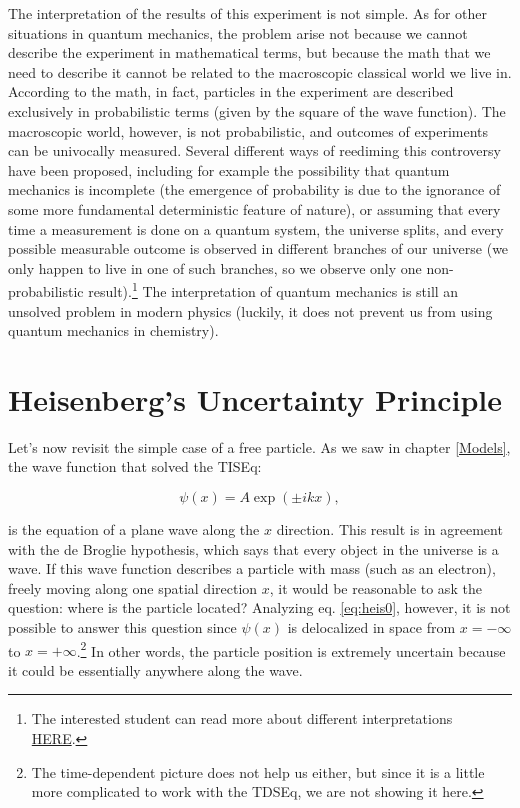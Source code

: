\documentclass[
  9pt,
]{extbook}
\theoremstyle{definition}
\theoremstyle{definition}
\theoremstyle{definition}
\theoremstyle{remark}
\begin{document}
The interpretation of the results of this experiment is not simple. As for other situations in quantum mechanics, the problem arise not because we cannot describe the experiment in mathematical terms, but because the math that we need to describe it cannot be related to the macroscopic classical world we live in. According to the math, in fact, particles in the experiment are described exclusively in probabilistic terms (given by the square of the wave function). The macroscopic world, however, is not probabilistic, and outcomes of experiments can be univocally measured. Several different ways of reediming this controversy have been proposed, including for example the possibility that quantum mechanics is incomplete (the emergence of probability is due to the ignorance of some more fundamental deterministic feature of nature), or assuming that every time a measurement is done on a quantum system, the universe splits, and every possible measurable outcome is observed in different branches of our universe (we only happen to live in one of such branches, so we observe only one non-probabilistic result).\footnote{The interested student can read more about different interpretations \href{https://en.wikipedia.org/wiki/Interpretations_of_quantum_mechanics}{HERE}.} The interpretation of quantum mechanics is still an unsolved problem in modern physics (luckily, it does not prevent us from using quantum mechanics in chemistry).

\hypertarget{heisenbergs-uncertainty-principle}{%
\section{Heisenberg's Uncertainty Principle}\label{heisenbergs-uncertainty-principle}}

Let's now revisit the simple case of a free particle. As we saw in chapter \ref{Models}, the wave function that solved the TISEq:

\begin{equation}
\psi(x) = A \exp(\pm ikx),
\label{eq:heis0}  
\end{equation}

is the equation of a plane wave along the \(x\) direction. This result is in agreement with the de Broglie hypothesis, which says that every object in the universe is a wave. If this wave function describes a particle with mass (such as an electron), freely moving along one spatial direction \(x\), it would be reasonable to ask the question: where is the particle located? Analyzing eq. \eqref{eq:heis0}, however, it is not possible to answer this question since \(\psi(x)\) is delocalized in space from \(x=-\infty\) to \(x=+\infty\).\footnote{The time-dependent picture does not help us either, but since it is a little more complicated to work with the TDSEq, we are not showing it here.} In other words, the particle position is extremely uncertain because it could be essentially anywhere along the wave.
\end{document}
